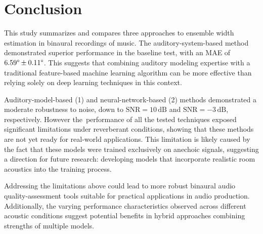\section{Conclusion}
    
This study summarizes and compares three approaches to ensemble width estimation in binaural recordings of music. The auditory-system-based method demonstrated superior performance in the baseline test, with an MAE of $6.59\degree \pm 0.11\degree$. This suggests that combining auditory modeling expertise with a traditional feature-based machine learning algorithm can be more effective than relying solely on deep learning techniques in this context.

Auditory-model-based (1) and neural-network-based (2) methods demonstrated a moderate robustness to noise, down to  $\mathrm{SNR}=10\,\mathrm{dB}$ and $\mathrm{SNR}=-3\,\mathrm{dB}$, respectively. However the~performance of all the tested techniques exposed significant limitations under reverberant conditions, showing that these methods are not yet ready for real-world applications. This limitation is likely caused by the fact that these models were trained exclusively on anechoic signals, suggesting a direction for future research: developing models that incorporate realistic room acoustics into the training process.

Addressing the limitations above could lead to more robust binaural audio quality-assessment tools suitable for practical applications in audio production. Additionally, the varying performance characteristics observed across different acoustic conditions suggest potential benefits in hybrid approaches combining strengths of multiple models.




